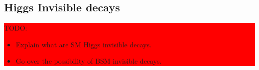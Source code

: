 \subsection{Higgs Invisible decays}

\colorbox{red}{
\begin{minipage}{0.95\linewidth}
TODO: 
\begin{itemize}
  \item Explain what are SM Higgs invisible decays.
  \item Go over the possibility of BSM invisible decays.
\end{itemize}

\end{minipage}
}

\cite{ARTICLE:Higgs_SpontaneousSymmetryBreakdown}
\cite{BOOK:Griffiths}




















% 

% 

% 

